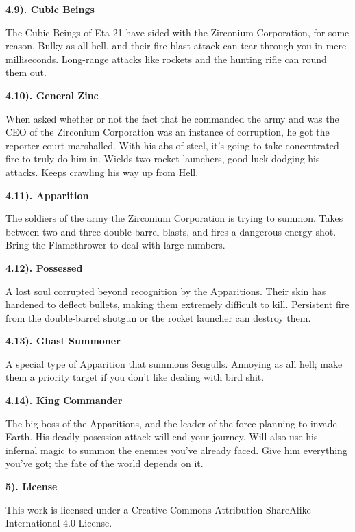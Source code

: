 \documentclass[12pt]{article}
\begin{document}
\begin{flushleft}
\textbf{4.9). Cubic Beings}

The Cubic Beings of Eta-21 have sided with the Zirconium Corporation, for some reason. Bulky as all hell, and their fire blast attack can tear through you in mere milliseconds. Long-range attacks like rockets and the hunting rifle can round them out.

\textbf{4.10). General Zinc}

When asked whether or not the fact that he commanded the army and was the CEO of the Zirconium Corporation was an instance of corruption, he got the reporter court-marshalled. With his abs of steel, it's going to take concentrated fire to truly do him in. Wields two rocket launchers, good luck dodging his attacks. Keeps crawling his way up from Hell.

\textbf{4.11). Apparition}

The soldiers of the army the Zirconium Corporation is trying to summon. Takes between two and three double-barrel blasts, and fires a dangerous energy shot. Bring the Flamethrower to deal with large numbers.

\textbf{4.12). Possessed}

A lost soul corrupted beyond recognition by the Apparitions. Their skin has hardened to deflect bullets, making them extremely difficult to kill. Persistent fire from the double-barrel shotgun or the rocket launcher can destroy them.

\textbf{4.13). Ghast Summoner}

A special type of Apparition that summons Seagulls. Annoying as all hell; make them a priority target if you don't like dealing with bird shit.

\textbf{4.14). King Commander}

The big boss of the Apparitions, and the leader of the force planning to invade Earth. His deadly posession attack will end your journey. Will also use his infernal magic to summon the enemies you've already faced. Give him everything you've got; the fate of the world depends on it.

\textbf{5). License}

This work is licensed under a Creative Commons Attribution-ShareAlike International 4.0 License.
\end{flushleft}
\end{document}
